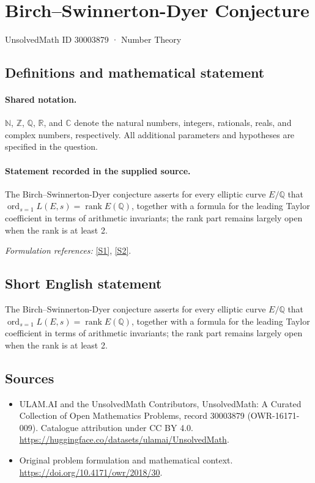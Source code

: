 \documentclass[11pt]{article}
\newcommand{\sref}[2]{\hyperlink{source:#1:#2}{[S#2]}}
\begin{document}
\setcounter{section}{30003878}
\section{Birch–Swinnerton-Dyer Conjecture}\label{30003879}
{\small UnsolvedMath ID 30003879 · Number Theory}
\subsection{Definitions and mathematical statement}

\paragraph{Shared notation.}$\mathbb N$, $\mathbb Z$, $\mathbb Q$, $\mathbb R$, and $\mathbb C$ denote the natural numbers, integers, rationals, reals, and complex numbers, respectively. All additional parameters and hypotheses are specified in the question.


\paragraph{Statement recorded in the supplied source.}
The Birch–Swinnerton-Dyer conjecture asserts for every elliptic curve $E/\mathbb{Q}$ that $\operatorname{ord}_{s=1}L(E,s)=\operatorname{rank}E(\mathbb{Q})$, together with a formula for the leading Taylor coefficient in terms of arithmetic invariants; the rank part remains largely open when the rank is at least 2.
\par\smallskip\textit{Formulation references:} \sref{30003879}{1}, \sref{30003879}{2}.
\subsection{Short English statement}
The Birch–Swinnerton-Dyer conjecture asserts for every elliptic curve $E/\mathbb{Q}$ that $\operatorname{ord}_{s=1}L(E,s)=\operatorname{rank}E(\mathbb{Q})$, together with a formula for the leading Taylor coefficient in terms of arithmetic invariants; the rank part remains largely open when the rank is at least 2.
\subsection{Sources}
\begin{itemize}
\item[\hypertarget{source:30003879:1}{S1}] ULAM.AI and the UnsolvedMath Contributors, UnsolvedMath: A Curated Collection of Open Mathematics Problems, record 30003879 (OWR-16171-009). Catalogue attribution under CC BY 4.0.
\url{https://huggingface.co/datasets/ulamai/UnsolvedMath}.
\item[\hypertarget{source:30003879:2}{S2}] Original problem formulation and mathematical context.
\url{https://doi.org/10.4171/owr/2018/30}.
\end{itemize}
\label{end:30003879}
\end{document}
